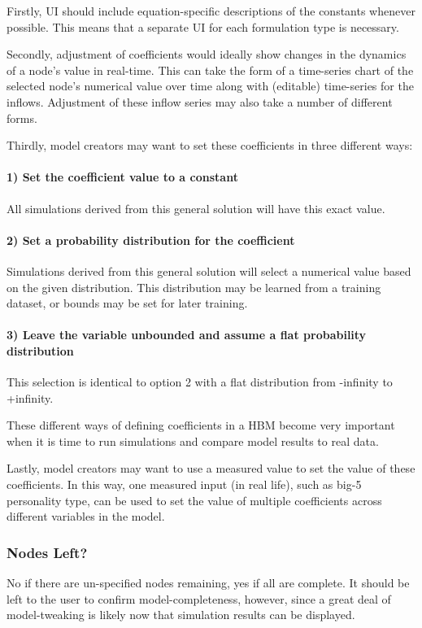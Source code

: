 \documentclass[conference]{IEEEtran}
\begin{document}
Firstly, UI should include equation-specific descriptions of the constants whenever possible. This means that a separate UI for each formulation type is necessary. 

Secondly, adjustment of coefficients would ideally show changes in the dynamics of a node's value in real-time. 
This can take the form of a time-series chart of the selected node's numerical value over time along with (editable) time-series for the inflows. 
Adjustment of these inflow series may also take a number of different forms. 

Thirdly, model creators may want to set these coefficients in three different ways: 
\paragraph{1) Set the coefficient value to a constant}
All simulations derived from this general solution will have this exact value.

\paragraph{2) Set a probability distribution for the coefficient}
Simulations derived from this general solution will select a numerical value based on the given distribution. 
This distribution may be learned from a training dataset, or bounds may be set for later training. 

\paragraph{3) Leave the variable unbounded and assume a flat probability distribution}
This selection is identical to option 2 with a flat distribution from -infinity to +infinity.


These different ways of defining coefficients in a HBM become very important when it is time to run simulations and compare model results to real data. 

Lastly, model creators may want to use a measured value to set the value of these coefficients. In this way, one measured input (in real life), such as big-5 personality type, can be used to set the value of multiple coefficients across different variables in the model.


\subsubsection{Nodes Left?}
No if there are un-specified nodes remaining, yes if all are complete. 
It should be left to the user to confirm model-completeness, however, since a great deal of model-tweaking is likely now that simulation results can be displayed.
\end{document}
